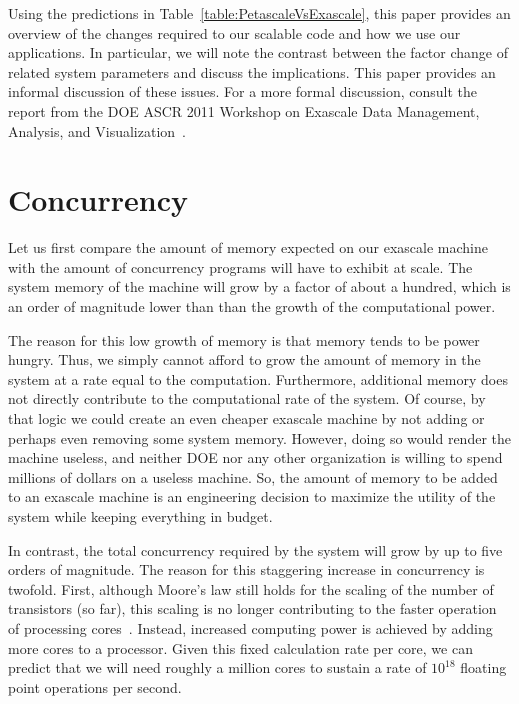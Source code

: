 \documentclass[conference]{IEEEtran}
\newcommand*{\lcite}[1]{~\cite{#1}}
\begin{document}
Using the predictions in Table~\ref{table:PetascaleVsExascale}, this paper
provides an overview of the changes required to our scalable code and how
we use our applications.  In particular, we will note the contrast between
the factor change of related system parameters and discuss the
implications.  This paper provides an informal discussion of these issues.
For a more formal discussion, consult the report from the DOE ASCR 2011
Workshop on Exascale Data Management, Analysis, and
Visualization\lcite{ScientificDiscoveryExascale2011}.

\section{Concurrency}
\label{sec:Concurrency}

\noindent
Let us first compare the amount of memory expected on our exascale machine
with the amount of concurrency programs will have to exhibit at scale.  The
system memory of the machine will grow by a factor of about a hundred,
which is an order of magnitude lower than than the growth of the
computational power.

The reason for this low growth of memory is that memory tends to be power
hungry.  Thus, we simply cannot afford to grow the amount of memory in the
system at a rate equal to the computation.  Furthermore, additional memory
does not directly contribute to the computational rate of the system.  Of
course, by that logic we could create an even cheaper exascale machine by
not adding or perhaps even removing some system memory.  However, doing so
would render the machine useless, and neither DOE nor any other
organization is willing to spend millions of dollars on a useless machine.
So, the amount of memory to be added to an exascale machine is an
engineering decision to maximize the utility of the system while keeping
everything in budget.

In contrast, the total concurrency required by the system will grow by up
to five orders of magnitude.  The reason for this staggering increase in
concurrency is twofold.  First, although Moore's law still holds for the
scaling of the number of transistors (so far), this scaling is no longer
contributing to the faster operation of processing
cores\lcite{ExascaleRoadMap}.  Instead, increased computing power is
achieved by adding more cores to a processor.  Given this fixed calculation
rate per core, we can predict that we will need roughly a million cores to
sustain a rate of $10^{18}$ floating point operations per second.
\end{document}

